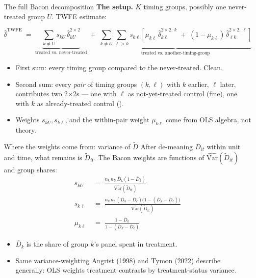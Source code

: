 \documentclass[aspectratio=169,11pt]{beamer}
\begin{document}
\begin{frame}{The full Bacon decomposition}
\vspace{0.4em}
\textbf{The setup.} $K$ timing groups, possibly one never-treated group $U$. \;TWFE estimate:

\vspace{0.2em}
\[
\widehat{\delta}^{\text{TWFE}} \;=\; \underbrace{\sum_{k\neq U} s_{kU}\, \widehat{\delta}^{2\times 2}_{kU}}_{\text{treated vs.\ never-treated}} \;+\; \underbrace{\sum_{k\neq U}\sum_{\ell > k} s_{k\ell}\!\left[ \mu_{k\ell}\, \widehat{\delta}^{2\times 2,\,k}_{k\ell} \;+\; (1-\mu_{k\ell})\, \widehat{\delta}^{2\times 2,\,\ell}_{\ell k}\right]}_{\text{treated vs.\ another-timing-group}}
\]

\vspace{0.5em}
\begin{itemize}\small
  \item First sum: every timing group compared to the never-treated. Clean.
  \item Second sum: every \textit{pair} of timing groups $(k, \ell)$ with $k$ earlier, $\ell$ later, contributes two 2$\times$2s --- one with $\ell$ as not-yet-treated control (fine), one with $k$ as already-treated control ().
  \item Weights $s_{kU}, s_{k\ell}$, and the within-pair weight $\mu_{k\ell}$ come from OLS algebra, not theory.
\end{itemize}
\end{frame}

\begin{frame}{Where the weights come from: variance of $\tilde D$}
After de-meaning $D_{it}$ within unit and time, what remains is $\tilde D_{it}$. \;The Bacon weights are functions of $\widehat{\mathrm{Var}}(\tilde D_{it})$ and group shares:
\begin{align*}
s_{kU} &\;=\; \frac{n_k\, n_U\, \overline{D}_k(1-\overline{D}_k)}{\widehat{\mathrm{Var}}(\tilde D_{it})} \\[0.2em]
s_{k\ell} &\;=\; \frac{n_k\, n_\ell\, (\overline{D}_k - \overline{D}_\ell)\big(1 - (\overline{D}_k - \overline{D}_\ell)\big)}{\widehat{\mathrm{Var}}(\tilde D_{it})} \\[0.2em]
\mu_{k\ell} &\;=\; \frac{1 - \overline{D}_k}{1 - (\overline{D}_k - \overline{D}_\ell)}
\end{align*}
\begin{itemize}\small
  \item $\overline{D}_k$ is the share of group $k$'s panel spent in treatment.
  \item Same variance-weighting Angrist (1998) and Tymon (2022) describe generally: OLS weights treatment contrasts by treatment-status variance.
\end{itemize}
\end{frame}
\end{document}
